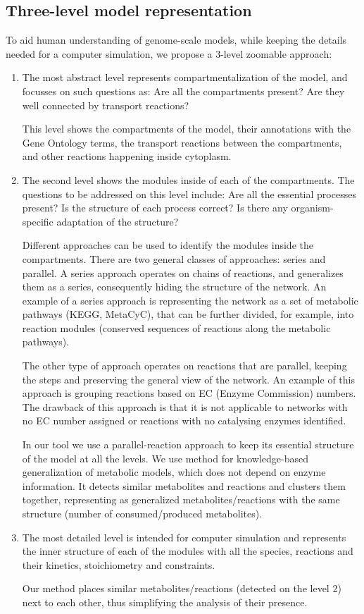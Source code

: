 \documentclass{bmcart}
\begin{document}
\subsection*{Three-level model representation}
To aid human understanding of genome-scale models, while keeping the details needed for a computer simulation, we propose a 3-level zoomable approach:
\begin{enumerate}
\item The most abstract level represents compartmentalization of the model, and focusses on such questions as: Are all the compartments present? Are they well connected by transport reactions?

This level shows the compartments of the model, their annotations with the Gene Ontology terms, the transport reactions between the compartments, and other reactions happening inside cytoplasm.

\item The second level shows the modules inside of each of the compartments. The questions to be addressed on this level include: Are all the essential processes present? Is the structure of each process correct? Is there any organism-specific adaptation of the structure?

Different approaches can be used to identify the modules inside the compartments. There are two general classes of approaches: series and parallel. A series approach operates on chains of reactions, and generalizes them as a series, consequently hiding the structure of the network. An example of a series approach is representing the network as a set of metabolic pathways (KEGG\cite{Kanehisa12}, MetaCyC\cite{Caspi2012}), that can be further divided, for example, into reaction modules (conserved sequences of reactions along the metabolic pathways)\cite{Muto2013}. 

The other type of approach operates on reactions that are parallel, keeping the steps and preserving the general view of the network. An example of this approach is grouping reactions based on EC (Enzyme Commission) numbers\cite{Tohsato2000}. The drawback of this approach is that it is not applicable to networks with no EC number assigned or reactions with no catalysing enzymes identified. 

In our tool we use a parallel-reaction approach to keep its essential structure of the model at all the levels. We use method for knowledge-based generalization of metabolic models, which does not depend on enzyme information. It detects similar metabolites and reactions and clusters them together, representing as generalized metabolites/reactions with the same structure (number of consumed/produced metabolites).

\item The most detailed level is intended for computer simulation and represents the inner structure of each of the modules with all the species, reactions and their kinetics, stoichiometry and constraints.

Our method places similar metabolites/reactions (detected on the level 2) next to each other, thus simplifying the analysis of their presence.

\end{enumerate}
\end{document}
